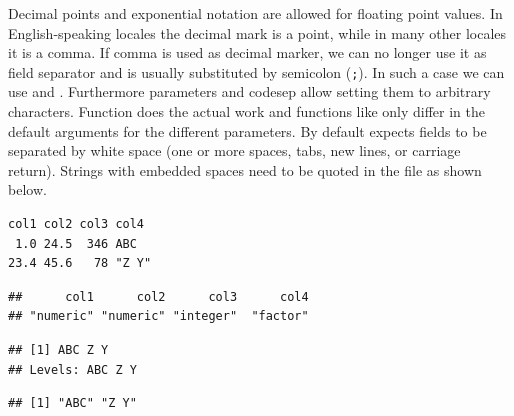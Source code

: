 \documentclass[krantz2]{krantz}\usepackage{knitr}%
\begin{document}
Decimal points and exponential notation are allowed for floating point values. In English-speaking locales the decimal mark is a point, while in many other locales it is a comma. If comma is used as decimal marker, we can no longer use it as field separator and is usually substituted by semicolon (\verb|;|). In such a case we can use  and . Furthermore parameters  and code{sep} allow setting them to arbitrary characters. Function  does the actual work and functions like  only differ in the default arguments for the different parameters. By default  expects fields to be separated by white space (one or more spaces, tabs, new lines, or carriage return). Strings with embedded spaces need to be quoted in the file as shown below.

\begin{knitrout}\footnotesize
{}\color{fgcolor}\begin{kframe}
\begin{verbatim}
col1 col2 col3 col4
 1.0 24.5  346 ABC
23.4 45.6   78 "Z Y"
\end{verbatim}
\end{kframe}
\end{knitrout}

\begin{knitrout}\footnotesize
{}\color{fgcolor}\begin{kframe}
\begin{alltt}
 \hlkwb{<-} \hlstd{(}\hlstd{,}  \hlstd{=} \hlstd{)}
\end{alltt}
\end{kframe}
\end{knitrout}

\begin{knitrout}\footnotesize
{}\color{fgcolor}\begin{kframe}
\begin{alltt}
\end{alltt}
\begin{verbatim}
##      col1      col2      col3      col4 
## "numeric" "numeric" "integer"  "factor"
\end{verbatim}
\begin{alltt}
\hlstd{from_txt_b.df[[}\hlstd{]]}
\end{alltt}
\begin{verbatim}
## [1] ABC Z Y
## Levels: ABC Z Y
\end{verbatim}
\begin{alltt}
\hlstd{(from_txt_b.df[[}\hlstd{]])}
\end{alltt}
\begin{verbatim}
## [1] "ABC" "Z Y"
\end{verbatim}
\end{kframe}
\end{knitrout}
\end{document}
